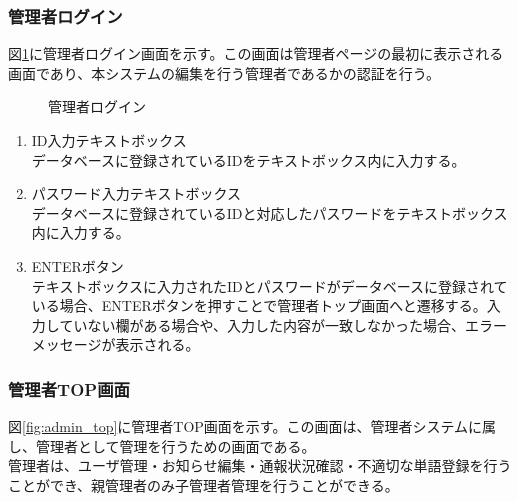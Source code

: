 \documentclass[a4j]{jarticle}
\begin{document}
\subsubsection{管理者ログイン}
図\ref{fig:login_admin}に管理者ログイン画面を示す。この画面は管理者ページの最初に表示される画面であり、本システムの編集を行う管理者であるかの認証を行う。
\begin{figure}[H]
\centering
{}
\caption{管理者ログイン}
\label{fig:login_admin}
\end{figure}
\begin{enumerate}
  \renewcommand{\labelenumi}{\textcircled{\scriptsize \theenumi}}

\item ID入力テキストボックス\\
データベースに登録されているIDをテキストボックス内に入力する。
\item パスワード入力テキストボックス\\
データベースに登録されているIDと対応したパスワードをテキストボックス内に入力する。
\item ENTERボタン\\
テキストボックスに入力されたIDとパスワードがデータベースに登録されている場合、ENTERボタンを押すことで管理者トップ画面へと遷移する。入力していない欄がある場合や、入力した内容が一致しなかった場合、エラーメッセージが表示される。

\end{enumerate}


\subsubsection{管理者TOP画面}
図\ref{fig:admin_top}に管理者TOP画面を示す。この画面は、管理者システムに属し、管理者として管理を行うための画面である。\\
管理者は、ユーザ管理・お知らせ編集・通報状況確認・不適切な単語登録を行うことができ、親管理者のみ子管理者管理を行うことができる。
\end{document}
